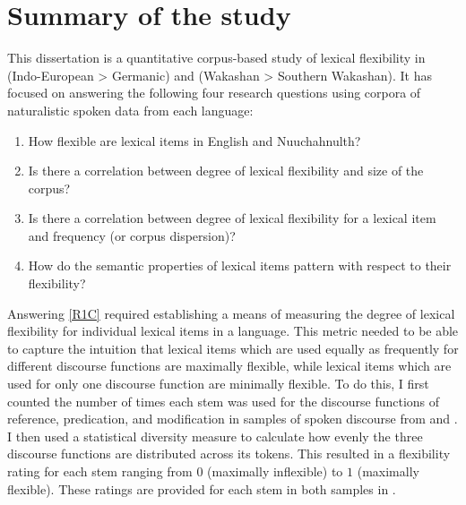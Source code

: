 \section{Summary of the study}
\label{sec:5.2}

This dissertation is a quantitative corpus-based study of lexical flexibility in  (Indo-European > Germanic) and  (Wakashan > Southern Wakashan). It has focused on answering the following four research questions using corpora of naturalistic spoken data from each language:

\begin{enumerate}[
  label      = {\textbf{R\arabic*:}},
  leftmargin = *,
  ref        = {R\arabic*}
]
  \item\label{R1C} How flexible are lexical items in English and Nuuchahnulth?
  \item\label{R2C} Is there a correlation between degree of lexical flexibility and size of the corpus?
  \item\label{R3C} Is there a correlation between degree of lexical flexibility for a lexical item and frequency (or corpus dispersion)?
  \item\label{R4C} How do the semantic properties of lexical items pattern with respect to their flexibility?
\end{enumerate}

Answering \ref{R1C} required establishing a means of measuring the degree of lexical flexibility for individual lexical items in a language. This metric needed to be able to capture the intuition that lexical items which are used equally as frequently for different discourse functions are maximally flexible, while lexical items which are used for only one discourse function are minimally flexible. To do this, I first counted the number of times each stem was used for the discourse functions of reference, predication, and modification in samples of spoken discourse from  and . I then used a statistical diversity measure  to calculate how evenly the three discourse functions are distributed across its tokens. This resulted in a flexibility rating for each stem ranging from $0$ (maximally inflexible) to $1$ (maximally flexible). These ratings are provided for each stem in both samples in .

